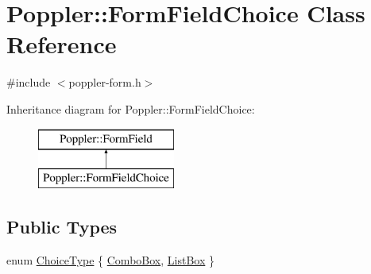 \hypertarget{class_poppler_1_1_form_field_choice}{}\section{Poppler\+:\+:Form\+Field\+Choice Class Reference}
\label{class_poppler_1_1_form_field_choice}


{\ttfamily \#include $<$poppler-\/form.\+h$>$}

Inheritance diagram for Poppler\+:\+:Form\+Field\+Choice\+:\begin{figure}[H]
\begin{center}
\leavevmode
\includegraphics[height=2.000000cm]{class_poppler_1_1_form_field_choice}
\end{center}
\end{figure}
\subsection*{Public Types}
\begin{DoxyCompactItemize}
\item 
enum \hyperlink{class_poppler_1_1_form_field_choice_a28f7cab7585f5630e26d1b5ed832c050}{Choice\+Type} \{ \hyperlink{class_poppler_1_1_form_field_choice_a28f7cab7585f5630e26d1b5ed832c050aaef28d49edcd0f5adb7eed2aec7e325f}{Combo\+Box}, 
\hyperlink{class_poppler_1_1_form_field_choice_a28f7cab7585f5630e26d1b5ed832c050a64881020d6e7432fd711fdb12dbf228c}{List\+Box}
 \}
\end{DoxyCompactItemize}
